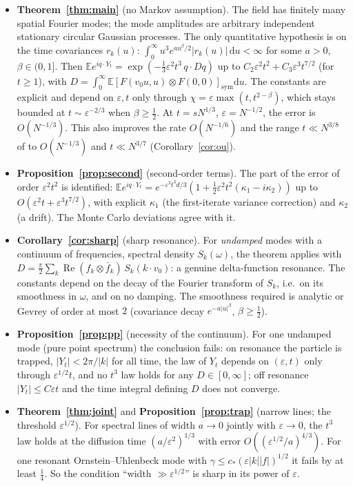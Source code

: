 \documentclass[11pt]{article}
\newcommand{\dd}{\mathrm{d}}
\newcommand{\E}{\mathbb{E}}
\newcommand{\eps}{\varepsilon}
\renewcommand{\Re}{\operatorname{Re}}
\theoremstyle{remark}
\begin{document}
\begin{itemize}
  \item \textbf{Theorem~\ref{thm:main}} (no Markov assumption). The field
    has finitely many spatial Fourier modes; the mode amplitudes are
    arbitrary independent stationary circular Gaussian processes. The only
    quantitative hypothesis is on the time covariances $r_k(u)$:
    $\int_0^\infty u^3e^{a u^\beta/2}|r_k(u)|\,\dd u<\infty$ for some $a>0$,
    $\beta\in(0,1]$. Then
    $\E e^{iq\cdot Y_t} = \exp(-\tfrac13\eps^2t^3\,q\cdot Dq)$ up to
    $C_2\eps^2t^2 + C_3\eps^3t^{7/2}$ (for $t\ge1$), with
    $D = \int_0^\infty\E[F(v_0u,u)\otimes F(0,0)]_{\mathrm{sym}}\dd u$. The
    constants are explicit and depend on $\eps,t$ only through
    $\chi = \eps\max(t,t^{2-\beta})$, which stays bounded at
    $t\sim\eps^{-2/3}$ when $\beta\ge\frac12$. At $t = sN^{1/3}$,
    $\eps = N^{-1/2}$, the error is $O(N^{-1/3})$. This also improves the
    rate $O(N^{-1/6})$ and the range $t\ll N^{3/8}$ of \cite[Theorem~1]{Note}
    to $O(N^{-1/3})$ and $t\ll N^{3/7}$ (Corollary~\ref{cor:ou}).
  \item \textbf{Proposition~\ref{prop:second}} (second-order terms). The
    part of the error of order $\eps^2t^2$ is identified:
    $\E e^{iq\cdot Y_t} = e^{-\eps^2t^3d/3}(1+\frac12\eps^2t^2(\kappa_1-i\kappa_2))$
    up to $O(\eps^2t+\eps^3t^{7/2})$, with explicit $\kappa_1$ (the
    first-iterate variance correction) and $\kappa_2$ (a drift). The
    Monte Carlo deviations agree with it.
  \item \textbf{Corollary~\ref{cor:sharp}} (sharp resonance). For
    \emph{undamped} modes with a continuum of frequencies, spectral density
    $S_k(\omega)$, the theorem applies with
    $D = \frac\pi2\sum_k\Re(f_k\otimes\bar f_k)\,S_k(k\cdot v_0)$: a genuine
    delta-function resonance. The constants depend on the decay of the
    Fourier transform of $S_k$, i.e.\ on its smoothness in $\omega$, and on
    no damping. The smoothness required is analytic or Gevrey of order at
    most $2$ (covariance decay $e^{-a|u|^\beta}$, $\beta\ge\frac12$).
  \item \textbf{Proposition~\ref{prop:pp}} (necessity of the continuum). For
    one undamped mode (pure point spectrum) the conclusion fails: on
    resonance the particle is trapped, $|Y_t|<2\pi/|k|$ for all time, the
    law of $Y_t$ depends on $(\eps,t)$ only through $\eps^{1/2}t$, and no
    $t^3$ law holds for any $D\in[0,\infty]$; off resonance
    $|Y_t|\le C\eps t$ and the time integral defining $D$ does not converge.
  \item \textbf{Theorem~\ref{thm:joint}} and
    \textbf{Proposition~\ref{prop:trap}} (narrow lines; the threshold
    $\eps^{1/2}$). For spectral lines of width $a\to0$ jointly with
    $\eps\to0$, the $t^3$ law holds at the diffusion time
    $(a/\eps^2)^{1/3}$ with error $O((\eps^{1/2}/a)^{4/3})$. For one resonant
    Ornstein--Uhlenbeck mode with $\gamma\le c_*(\eps|k||f|)^{1/2}$ it fails
    by at least $\frac14$. So the condition ``width $\gg\eps^{1/2}$'' is
    sharp in its power of $\eps$.
\end{itemize}
\end{document}

